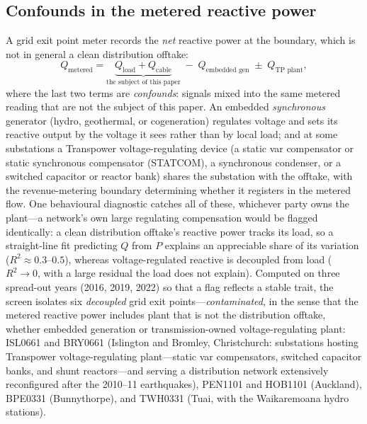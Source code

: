 \documentclass[journal]{IEEEtran}
\begin{document}
\subsection{Confounds in the metered reactive power}
A grid exit point meter records the \emph{net} reactive power at the boundary, which
is not in general a clean distribution offtake:
\begin{equation*}
Q_{\text{metered}} = \underbrace{Q_{\text{load}} + Q_{\text{cable}}}_{\text{the subject of this paper}}
\;-\; Q_{\text{embedded gen}} \;\pm\; Q_{\text{TP plant}},
\end{equation*}
where the last two terms are \emph{confounds}: signals mixed into the same
metered reading that are not the subject of this paper. An embedded \emph{synchronous} generator
(hydro, geothermal, or cogeneration) regulates voltage and sets its reactive output
by the voltage it sees rather than by local load; and at some substations a
Transpower voltage-regulating device (a static var compensator or static
synchronous compensator (STATCOM), a
synchronous condenser, or a switched capacitor or reactor bank) shares the
substation with the offtake, with the revenue-metering boundary determining
whether it registers in the metered flow. One behavioural diagnostic catches all of these,
whichever party owns the plant---a network's own large regulating compensation
would be flagged identically: a clean distribution offtake's reactive power tracks
its load, so a straight-line fit predicting $Q$ from $P$ explains an appreciable
share of its variation ($R^2 \approx 0.3$--$0.5$), whereas voltage-regulated
reactive is decoupled from load ($R^2 \to 0$, with a large residual the load
does not explain). Computed on three
spread-out years (2016, 2019, 2022) so that a flag reflects a stable trait, the screen isolates six \emph{decoupled} grid exit
points---\emph{contaminated}, in the sense that the metered reactive power
includes plant that is not the distribution offtake, whether embedded generation
or transmission-owned voltage-regulating plant: ISL0661 and BRY0661 (Islington and
Bromley, Christchurch: substations hosting Transpower voltage-regulating
plant---static var compensators, switched capacitor banks, and shunt
reactors---and serving a distribution network extensively reconfigured after
the 2010--11 earthquakes), PEN1101 and HOB1101 (Auckland), BPE0331 (Bunnythorpe), and TWH0331 (Tuai,
with the Waikaremoana hydro stations).
\end{document}
